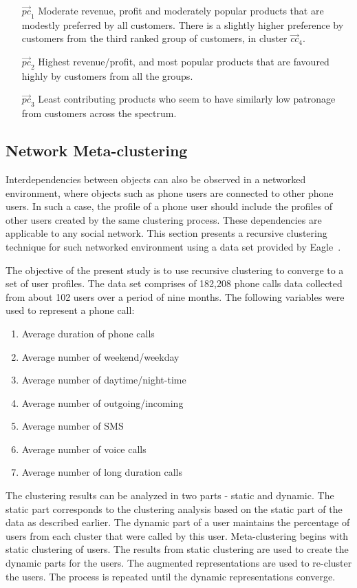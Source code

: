 \documentclass[oribibl]{llncs}
\begin{document}
\begin{itemize}
\item [$\vec{pc}_1$] Moderate revenue, profit and moderately popular products that are modestly preferred by all customers. There is a slightly higher preference by customers from the third ranked group of customers, in cluster $\vec{cc}_4$.
\item [$\vec{pc}_2$] Highest revenue/profit, and most popular products that are favoured highly by customers from all the groups.
\item [$\vec{pc}_3$] Least contributing products who seem to have similarly low patronage from customers across the spectrum.
\end{itemize}

\subsection{Network Meta-clustering}
Interdependencies between objects can also be observed in a networked environment, where objects such as phone users are connected to other phone users. In such a case, the profile of a phone user should include the profiles of other users created by the same clustering process. These dependencies are applicable to any social network. This section presents a recursive clustering technique for such networked environment using a data set provided by Eagle~\cite{Eagle2010}.

The objective of the present study is to use recursive
clustering to converge to a set of user profiles. 
The data set comprises of 182,208 phone calls data collected 
from about 102 users over a period of nine months. 
The following variables were used to represent a phone call:

\begin{enumerate}
\item
Average duration of phone calls
\item
Average number of weekend/weekday
\item
Average number of daytime/night-time
\item
Average number of outgoing/incoming 
\item
Average number of SMS
\item
Average number of voice calls
\item
Average number of long duration calls
\end{enumerate}

The clustering results can be analyzed in two parts - static and
dynamic. 
The static part corresponds to the clustering analysis based
on the static part of the data as described earlier.
The dynamic part of a user maintains the percentage of users from each cluster that were called by this user.
Meta-clustering begins with static clustering of users.
The results from static clustering are used to create the dynamic parts for the users.
The augmented representations are used to re-cluster the users.
The process is repeated until the dynamic representations converge.
\end{document}
